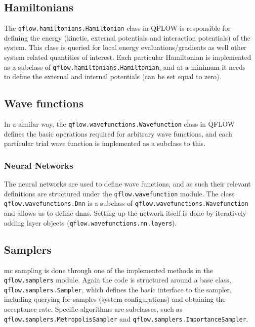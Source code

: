 \documentclass[Thesis.tex]{subfiles}
\begin{document}
\subsection{Hamiltonians}

The \texttt{qflow.\-hamiltonians.\-Hamiltonian} class in QFLOW is responsible for defining the energy
(kinetic, external potentials and interaction potentials) of the system. This
class is queried for local energy evaluations/gradients as well other system
related quantities of interest. Each particular Hamiltonian is implemented as a
subclass of \texttt{qflow.\-hamiltonians.\-Hamiltonian}, and at a minimum it needs to define the
external and internal potentials (can be set equal to zero).

\subsection{Wave functions}

In a similar way, the \texttt{qflow.\-wavefunctions.\-Wavefunction} class in QFLOW defines the basic
operations required for arbitrary wave functions, and each particular trial wave
function is implemented as a subclass to this.

\subsubsection{Neural Networks}

The neural networks are used to define wave functions, and as such their
relevant definitions are structured under the \texttt{qflow.\-wavefunction} module. The
class \texttt{qflow.\-wavefunctions.\-Dnn}  is a subclass of
\texttt{qflow.\-wavefunctions.\-Wavefunction} and allows us to define \glspl{dnn}.
Setting up the network itself is done by iteratively adding layer objects (\texttt{qflow.\-wavefunctions.\-nn.\-layers}).

\subsection{Samplers}

\Gls{mc} sampling is done through one of the implemented methods in the
\texttt{qflow.\-samplers} module. Again the code is structured around a base
class, \texttt{qflow.\-samplers.\-Sampler}, which defines the basic interface to the
sampler, including querying for samples (system configurations) and obtaining
the acceptance rate. Specific algorithms are subclasses, such as
\texttt{qflow.\-samplers.\-MetropolisSampler} and
\texttt{qflow.\-samplers.\-ImportanceSampler}.
\end{document}
